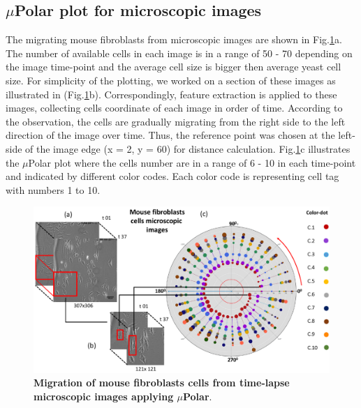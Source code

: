 \documentclass[conference]{IEEEtran}
\begin{document}
\subsection{$\mu$Polar plot for microscopic images}
 The migrating mouse fibroblasts from microscopic images are  shown in Fig.\ref{fig:scopic}a. The number of available cells in each image is in a range of 50 - 70 depending on the image time-point and the average cell size is bigger then average yeast cell size. For simplicity of the plotting, we worked on a section of these images as illustrated in (Fig.\ref{fig:scopic}b). Correspondingly, feature extraction is applied to these images, collecting cells coordinate of each image in order of time. According to the observation, the cells are gradually migrating from the right side to the left direction of the image over time. Thus, the reference point was chosen at the left-side of the image edge (x = 2, y = 60) for distance calculation. Fig.\ref{fig:scopic}c illustrates the $\mu$Polar plot where the cells number are in a range of 6 - 10 in each time-point and indicated by different color codes. Each color code is representing cell tag with numbers 1 to 10.  


\begin{figure}
\centering
\includegraphics[width=\textwidth,height=10 cm]{Patterns/microscopic.pdf}
\caption{ \textbf{Migration of mouse fibroblasts cells from time-lapse microscopic images applying $\mu$Polar}.}
\label{fig:scopic}
\end{figure}
\end{document}
